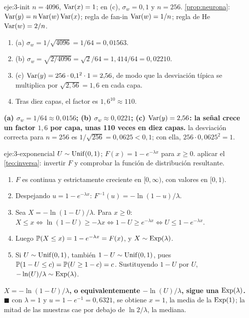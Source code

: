 \begin{solucion}{eje:3-init}
\datos $n=4096$, $\operatorname{Var}(x)=1$; en (c), $\sigma_w=0{,}1$ y $n=256$.
\planteamiento \cref{prop:neurona}: $\operatorname{Var}(y)=n\operatorname{Var}(w)\operatorname{Var}(x)$; regla de fan-in $\operatorname{Var}(w)=1/n$; regla de He $\operatorname{Var}(w)=2/n$.
\pasos
\begin{enumerate}[label=\arabic*.]
  \item (a) $\sigma_w=1/\sqrt{4096}=1/64=0{,}01563$.
  \item (b) $\sigma_w=\sqrt{2/4096}=\sqrt2/64=1{,}414/64=0{,}02210$.
  \item (c) $\operatorname{Var}(y)=256\cdot 0{,}1^{2}\cdot 1=2{,}56$, de modo que la desviación típica se multiplica por $\sqrt{2{,}56}=1{,}6$ en cada capa.
  \item Tras diez capas, el factor es $1{,}6^{10}\approx 110$.
\end{enumerate}
\resultado \textbf{(a) $\sigma_w=1/64\approx 0{,}0156$; (b) $\sigma_w\approx 0{,}0221$; (c) $\operatorname{Var}(y)=2{,}56$: la señal crece un factor $1{,}6$ por capa, unas 110 veces en diez capas.}
\comprobacion la desviación correcta para $n=256$ es $1/\sqrt{256}=0{,}0625<0{,}1$; con ella, $256\cdot 0{,}0625^{2}=1$.
\end{solucion}

\begin{solucion}{eje:3-exponencial}
\datos $U\sim\operatorname{Unif}(0,1)$; $F(x)=1-e^{-\lambda x}$ para $x\ge 0$.
\planteamiento aplicar el \cref{teo:inversa}: invertir $F$ y comprobar la función de distribución resultante.
\pasos
\begin{enumerate}[label=\arabic*.]
  \item $F$ es continua y estrictamente creciente en $[0,\infty)$, con valores en $[0,1)$.
  \item Despejando $u=1-e^{-\lambda x}$: $F^{-1}(u)=-\ln(1-u)/\lambda$.
  \item Sea $X=-\ln(1-U)/\lambda$. Para $x\ge 0$: $X\le x\iff\ln(1-U)\ge-\lambda x\iff 1-U\ge e^{-\lambda x}\iff U\le 1-e^{-\lambda x}$.
  \item Luego $\mathbb{P}(X\le x)=1-e^{-\lambda x}=F(x)$, y $X\sim\operatorname{Exp}(\lambda)$.
  \item Si $U\sim\operatorname{Unif}(0,1)$, también $1-U\sim\operatorname{Unif}(0,1)$, pues $\mathbb{P}(1-U\le c)=\mathbb{P}(U\ge 1-c)=c$. Sustituyendo $1-U$ por $U$, $-\ln(U)/\lambda\sim\operatorname{Exp}(\lambda)$.
\end{enumerate}
\resultado \textbf{$X=-\ln(1-U)/\lambda$, o equivalentemente $-\ln(U)/\lambda$, sigue una $\operatorname{Exp}(\lambda)$.} $\blacksquare$
\comprobacion con $\lambda=1$ y $u=1-e^{-1}=0{,}6321$, se obtiene $x=1$, la media de la $\operatorname{Exp}(1)$; la mitad de las muestras cae por debajo de $\ln 2/\lambda$, la mediana.
\end{solucion}

